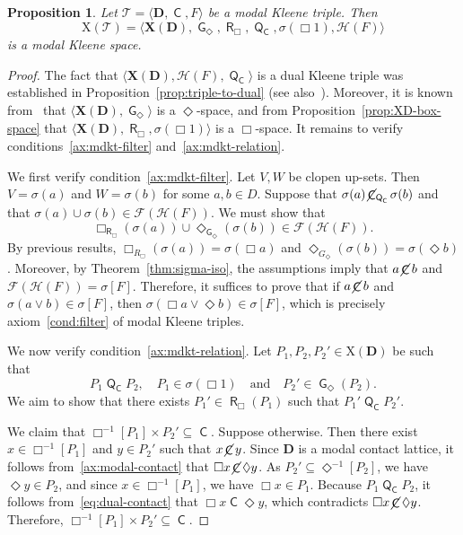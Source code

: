 \documentclass{article}
\newtheorem{proposition}[theorem]{Proposition}
\DeclareMathOperator{\con}{\mathsf{C}}
\DeclareMathOperator{\notcon}{\cancel{ \con}}
\DeclareMathOperator{\Q}{\mathsf{Q}}
\DeclareMathOperator{\G}{\mathsf{G}}
\DeclareMathOperator{\R}{\mathsf{R}}
\newcommand{\D}{\mathbf{D}}
\newcommand{\X}{\mathbf{X}}
\newcommand{\T}{\mathcal{T}}
\begin{document}
\begin{proposition}
\label{prop:triple-to-mdkt}
Let $\T = \langle \D, \con, F \rangle$ be a modal Kleene triple. Then
\[
\mathrm{X}(\T) = \langle \X(\D), \G_\Diamond, \R_\Box, \Q_{\con},\sigma(\Box 1), \mathcal{H}(F) \rangle
\]
is a modal Kleene space.
\end{proposition}
\begin{proof}
The fact that $\langle \X(\D), \mathcal{H}(F) ,\Q_{\con}\rangle$ is a dual Kleene triple was established in Proposition~\ref{prop:triple-to-dual} (see also~\cite{jalali}). Moreover, it is known from~\cite{petrovich1996} that $\langle \X(\D), \G_\Diamond \rangle$ is a $\Diamond$-space, and from Proposition~\ref{prop:XD-box-space} that $\langle \X(\D), \R_\Box, \sigma(\Box 1) \rangle$ is a $\Box$-space. It remains to verify conditions~\eqref{ax:mdkt-filter} and~\eqref{ax:mdkt-relation}.

We first verify condition~\eqref{ax:mdkt-filter}. Let $V, W$ be clopen up-sets. Then $V = \sigma(a)$ and $W = \sigma(b)$ for some $a, b \in D$. Suppose that $\sigma(a) \notcon_{\Q_{\con}} \sigma(b)$ and that $\sigma(a) \cup \sigma(b) \in \mathcal{F}(\mathcal{H}(F))$. We must show that
\[
\Box_{\R_\Box}(\sigma(a)) \cup \Diamond_{\G_\Diamond}(\sigma(b)) \in \mathcal{F}(\mathcal{H}(F)).
\]
By previous results, $\Box_{R_\Box}(\sigma(a)) = \sigma(\Box a)$ and $\Diamond_{G_\Diamond}(\sigma(b)) = \sigma(\Diamond b)$. Moreover, by Theorem~\ref{thm:sigma-iso}, the assumptions imply that $a \notcon b$ and $\mathcal{F}(\mathcal{H}(F)) = \sigma[F]$. Therefore, it suffices to prove that if $a \notcon b$ and $\sigma(a \vee b) \in \sigma[F]$, then $\sigma(\Box a \vee \Diamond b) \in \sigma[F]$, which is precisely axiom~\eqref{cond:filter} of modal Kleene triples.

We now verify condition~\eqref{ax:mdkt-relation}. Let $P_1, P_2, P_2' \in \mathrm{X}(\D)$ be such that
\[
P_1 \Q_{\con} P_2, \quad P_1 \in \sigma(\Box 1) \quad \text{and} \quad P_2' \in \G_\Diamond(P_2).
\]
We aim to show that there exists $P_1' \in \R_\Box(P_1)$ such that $P_1'\Q_{\con} P_2'$.

We claim that $\Box^{-1}[P_1] \times P_2' \subseteq \con$. Suppose otherwise. Then there exist $x \in \Box^{-1}[P_1]$ and $y \in P_2'$ such that $x \notcon y$. Since $\D$ is a modal contact lattice, it follows from~\eqref{ax:modal-contact} that $\Box x \notcon \Diamond y$. As $P_2' \subseteq \Diamond^{-1}[P_2]$, we have $\Diamond y \in P_2$, and since $x \in \Box^{-1}[P_1]$, we have $\Box x \in P_1$. Because $P_1 \Q_{\con} P_2$, it follows from~\eqref{eq:dual-contact} that $\Box x \con \Diamond y$, which contradicts $\Box x \notcon \Diamond y$. Therefore, $\Box^{-1}[P_1] \times P_2' \subseteq \con$.


\end{proof}
\end{document}
